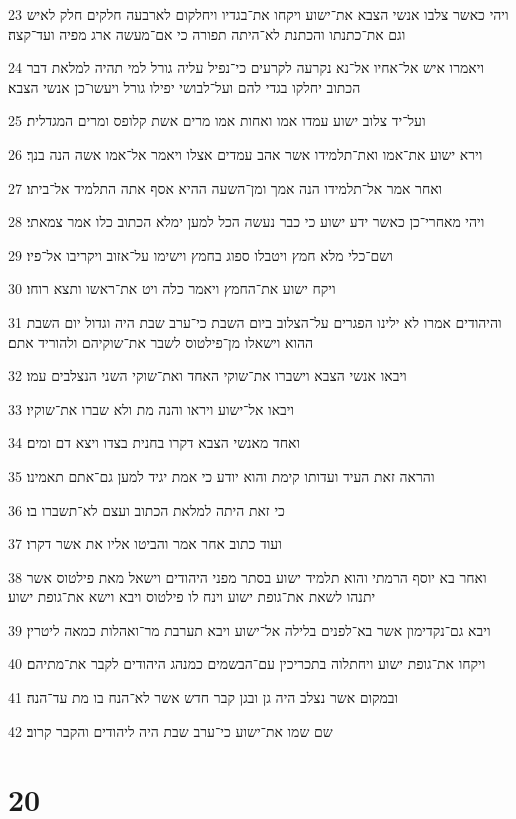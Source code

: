 \par 23 ויהי כאשר צלבו אנשי הצבא את־ישוע ויקחו את־בגדיו ויחלקום לארבעה חלקים חלק לאיש וגם את־כתנתו והכתנת לא־היתה תפורה כי אם־מעשה ארג מפיה ועד־קצה׃
\par 24 ויאמרו איש אל־אחיו אל־נא נקרעה לקרעים כי־נפיל עליה גורל למי תהיה למלאת דבר הכתוב יחלקו בגדי להם ועל־לבושי יפילו גורל ויעשו־כן אנשי הצבא׃
\par 25 ועל־יד צלוב ישוע עמדו אמו ואחות אמו מרים אשת קלופס ומרים המגדלית׃
\par 26 וירא ישוע את־אמו ואת־תלמידו אשר אהב עמדים אצלו ויאמר אל־אמו אשה הנה בנך׃
\par 27 ואחר אמר אל־תלמידו הנה אמך ומן־השעה ההיא אסף אתה התלמיד אל־ביתו׃
\par 28 ויהי מאחרי־כן כאשר ידע ישוע כי כבר נעשה הכל למען ימלא הכתוב כלו אמר צמאתי׃
\par 29 ושם־כלי מלא חמץ ויטבלו ספוג בחמץ וישימו על־אזוב ויקריבו אל־פיו׃
\par 30 ויקח ישוע את־החמץ ויאמר כלה ויט את־ראשו ותצא רוחו׃
\par 31 והיהודים אמרו לא ילינו הפגרים על־הצלוב ביום השבת כי־ערב שבת היה וגדול יום השבת ההוא וישאלו מן־פילטוס לשבר את־שוקיהם ולהוריד אתם׃
\par 32 ויבאו אנשי הצבא וישברו את־שוקי האחד ואת־שוקי השני הנצלבים עמו׃
\par 33 ויבאו אל־ישוע ויראו והנה מת ולא שברו את־שוקיו׃
\par 34 ואחד מאנשי הצבא דקרו בחנית בצדו ויצא דם ומים׃
\par 35 והראה זאת העיד ועדותו קימת והוא יודע כי אמת יגיד למען גם־אתם תאמינו׃
\par 36 כי זאת היתה למלאת הכתוב ועצם לא־תשברו בו׃
\par 37 ועוד כתוב אחר אמר והביטו אליו את אשר דקרו׃
\par 38 ואחר בא יוסף הרמתי והוא תלמיד ישוע בסתר מפני היהודים וישאל מאת פילטוס אשר יתנהו לשאת את־גופת ישוע וינח לו פילטוס ויבא וישא את־גופת ישוע׃
\par 39 ויבא גם־נקדימון אשר בא־לפנים בלילה אל־ישוע ויבא תערבת מר־ואהלות כמאה ליטרין׃
\par 40 ויקחו את־גופת ישוע ויחתלוה בתכריכין עם־הבשמים כמנהג היהודים לקבר את־מתיהם׃
\par 41 ובמקום אשר נצלב היה גן ובגן קבר חדש אשר לא־הנח בו מת עד־הנה׃
\par 42 שם שמו את־ישוע כי־ערב שבת היה ליהודים והקבר קרוב׃

\chapter{20}

